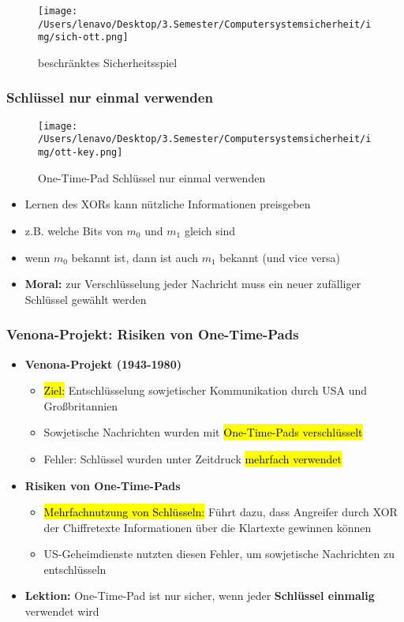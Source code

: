 \documentclass[a4paper, 10pt]{article}
\begin{document}
\begin{figure}[h]
    \centering
    \texttt{[image: /Users/lenavo/Desktop/3.Semester/Computersystemsicherheit/img/sich-ott.png]}
    \caption{beschränktes Sicherheitsspiel}
    \label{fig:enter-label}
\end{figure}

\subsubsection{Schlüssel nur einmal verwenden}
\begin{figure}[h]
    \centering
    \texttt{[image: /Users/lenavo/Desktop/3.Semester/Computersystemsicherheit/img/ott-key.png]}
    \caption{One-Time-Pad Schlüssel nur einmal verwenden}
    \label{fig:enter-label}
\end{figure}

\begin{itemize}
    \item Lernen des XORs kann nützliche Informationen preisgeben
    \item z.B. welche Bits von $m_0$ und $m_1$ gleich sind
    \item wenn $m_0$ bekannt ist, dann ist auch $m_1$ bekannt (und vice versa)
    \item \textbf{Moral:} zur Verschlüsselung jeder Nachricht muss ein neuer zufälliger Schlüssel gewählt werden
\end{itemize}

\subsubsection{Venona-Projekt: Risiken von One-Time-Pads}
\begin{itemize}
    \item \textbf{Venona-Projekt (1943-1980)}
    \begin{itemize}
        \item \hl{Ziel:} Entschlüsselung sowjetischer Kommunikation durch USA und Großbritannien
        \item Sowjetische Nachrichten wurden mit \hl{One-Time-Pads verschlüsselt}
        \item Fehler: Schlüssel wurden unter Zeitdruck \hl{mehrfach verwendet}
    \end{itemize}

    \item \textbf{Risiken von One-Time-Pads}
    \begin{itemize}
        \item \hl{Mehrfachnutzung von Schlüsseln:} Führt dazu, dass Angreifer durch XOR der Chiffretexte Informationen über die Klartexte gewinnen können
        \item US-Geheimdienste nutzten diesen Fehler, um sowjetische Nachrichten zu entschlüsseln
    \end{itemize}

    \item \textbf{Lektion:} One-Time-Pad ist nur sicher, wenn jeder \textbf{Schlüssel einmalig} verwendet wird
\end{itemize}
\end{document}
